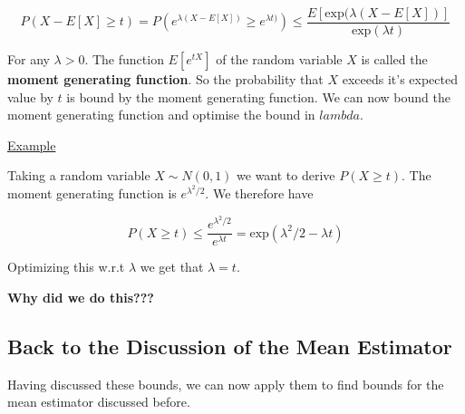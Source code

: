 \documentclass[12pt, authoryear]{elsarticle}
\begin{document}
$$ P( X - E[X] \geq t )  = P( e^{\lambda(X- E[X])} \geq e^{\lambda t)}) \leq \frac{E [\text{exp}(\lambda(X- E[X])]}{\text{exp}(\lambda t)}$$

For any $\lambda > 0 $.  The function $E[e^{tX}]$ of the random variable $X$ is called the \textbf{moment generating function}.  So the probability that $X$ exceeds it's expected value by $t$ is bound by the moment generating function. We can now bound the moment generating function and optimise the bound in $lambda$. 

\underline{Example} 

Taking a random variable $X \sim N(0,1) $ we want to derive $P(X \geq t)$. The moment generating function is $e^{\lambda^2 / 2}$. We therefore have 

$$ P(X \geq t) \leq \frac{e^{\lambda ^2 / 2}}{e^{\lambda t}} = \text{exp}(\lambda^2 / 2 - \lambda t)$$

Optimizing this w.r.t $\lambda$ we get that $\lambda = t$.

\textbf{Why did we do this???} 

\subsection{Back to the Discussion of the Mean Estimator}

Having discussed these bounds, we can now apply them to find bounds for the mean estimator discussed before. 
\end{document}
